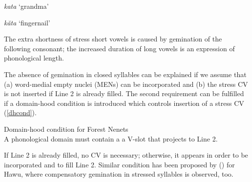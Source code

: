 \documentclass[a4paper, 12pt]{article}
\newcommand{\citeay}[2][]{
   \citeauthor{#2} (\citeyear[#1]{#2})}
\begin{document}
		\begin{minipage}{0.4\linewidth}
			\ex \emph{kata} `grandma' \\
			\xe
		\end{minipage}
		\hfill
		\begin{minipage}{0.5\linewidth}
			\ex \emph{kăta} `fingernail' \\
			\xe
		\end{minipage}
		
	\noindent The extra shortness of stress short vowels is caused by gemination of the following consonant; the increased duration of long vowels is an expression of phonological length.
	
	The absence of gemination in closed syllables can be explained if we assume that (a) word-medial empty nuclei (MENs) can be incorporated and (b) the stress CV is not inserted if Line 2 is already filled. The second requirement can be fulfilled if a domain-hood condition is introduced which controls insertion of a stress CV (\ref{dhcond}). 
	
	\ex\label{dhcond}Domain-hood condition for Forest Nenets\\
		A phonological domain must contain a a V-slot that projects to Line 2.
	\xe
	
	If Line 2 is already filled, no CV is necessary; otherwise, it appears in order to be incorporated and to fill Line 2. Similar condition has been proposed by \citeay{ulfsbjorninn2021} for Hawu, where compensatory gemination in stressed syllables is observed, too.
	
\end{document}
